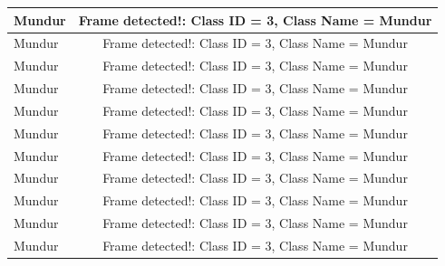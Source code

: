 \begin{longtable}{|l|c|}
  Mundur         & Frame detected!: Class ID = 3, Class Name = Mundur \\ \hline
  Mundur         & Frame detected!: Class ID = 3, Class Name = Mundur \\ \hline
  Mundur         & Frame detected!: Class ID = 3, Class Name = Mundur \\ \hline
  Mundur         & Frame detected!: Class ID = 3, Class Name = Mundur \\ \hline
  Mundur         & Frame detected!: Class ID = 3, Class Name = Mundur \\ \hline
  Mundur         & Frame detected!: Class ID = 3, Class Name = Mundur \\ \hline
  Mundur         & Frame detected!: Class ID = 3, Class Name = Mundur \\ \hline
  Mundur         & Frame detected!: Class ID = 3, Class Name = Mundur \\ \hline
  Mundur         & Frame detected!: Class ID = 3, Class Name = Mundur \\ \hline
  Mundur         & Frame detected!: Class ID = 3, Class Name = Mundur \\ \hline
  Mundur         & Frame detected!: Class ID = 3, Class Name = Mundur \\ \hline
\end{longtable}

